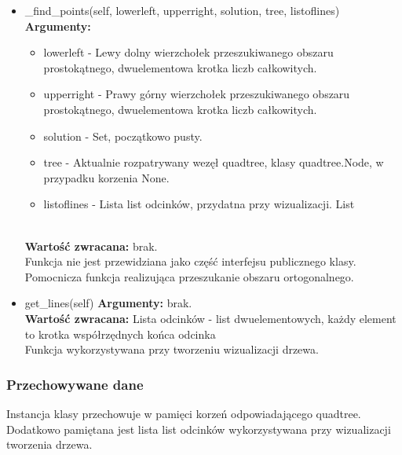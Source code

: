 \documentclass{article}
\begin{document}
\begin{itemize}
                    \item \_find\_points(self, lowerleft, upperright, solution, tree, listoflines)\\
                        \textbf{Argumenty:} \begin{itemize}
                                \item lowerleft - Lewy dolny wierzchołek przeszukiwanego obszaru prostokątnego, dwuelementowa krotka liczb
                                całkowitych. 
                                \item upperright - Prawy górny wierzchołek przeszukiwanego obszaru prostokątnego, dwuelementowa krotka liczb całkowitych. 
                                \item solution - Set, początkowo pusty.
                                \item tree - Aktualnie rozpatrywany wezęł quadtree, klasy quadtree.Node, w przypadku korzenia None.
                                \item listoflines - Lista list odcinków, przydatna przy wizualizacji. List
                            \end{itemize}\\
                        \textbf{Wartość zwracana:} brak.\\
                        Funkcja nie jest przewidziana jako część interfejsu publicznego klasy. \\
                        Pomocnicza funkcja realizująca przeszukanie obszaru ortogonalnego. 
                        
                    \item get\_lines(self)
                        \textbf{Argumenty:} brak.\\
                        \textbf{Wartość zwracana:} Lista odcinków - list dwuelementowych, każdy element to krotka współrzędnych końca odcinka\\
                        Funkcja wykorzystywana przy tworzeniu wizualizacji drzewa. 
                \end{itemize}
            \subsubsection{Przechowywane dane}
                Instancja klasy przechowuje w pamięci korzeń odpowiadającego quadtree.\\
                Dodatkowo pamiętana jest lista list odcinków wykorzystywana przy wizualizacji tworzenia drzewa.
\end{document}
